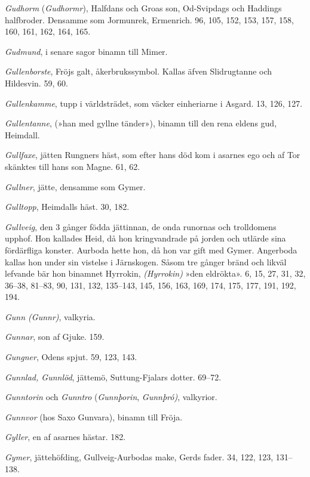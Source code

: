 \emph{Gudhorm} (\emph{Gudhormr}), Halfdans och Groas son, Od-Svipdags
och Haddings halfbroder. Densamme som Jormunrek, Ermenrich. 96, 105,
152, 153, 157, 158, 160, 161, 162, 164, 165.

\emph{Gudmund}, i senare sagor binamn till Mimer.

\emph{Gullenborste}, Fröjs galt, åkerbrukssymbol. Kallas äfven
Slidrugtanne och Hildesvin. 59, 60.

\emph{Gullenkamme}, tupp i världsträdet, som väcker einheriarne i
Asgard. 13, 126, 127.

\protect\hypertarget{lb1625905.xhtmlux5cux23start221}{}{}\protect\hypertarget{lb1625905.xhtmlux5cux23start221-a}{}{}\protect\hypertarget{lb1625905.xhtmlux5cux23start221-b}{}{}\protect\hypertarget{lb1625905.xhtmlux5cux23start221-c}{}{}\protect\hypertarget{lb1625905.xhtmlux5cux23start221-d}{}{}

\emph{Gullentanne}, (»han med gyllne tänder»), binamn till den rena
eldens gud, Heimdall.

\emph{Gullfaxe}, jätten Rungners häst, som efter hans död kom i asarnes
ego och af Tor skänktes till hans son Magne. 61, 62.

\emph{Gullner}, jätte, densamme som Gymer.

\emph{Gulltopp}, Heimdalls häst. 30, 182.

\emph{Gullveig}, den 3 gånger födda jättinnan, de onda runornas och
trolldomens upphof. Hon kallades Heid, då hon kringvandrade på jorden
och utlärde sina fördärfliga konster. Aurboda hette hon, då hon var gift
med Gymer. Angerboda kallas hon under sin vistelse i Järnskogen. Såsom
tre gånger bränd och likväl lefvande bär hon binamnet Hyrrokin,
\emph{(Hyrrokin)} »den eldrökta». 6, 15, 27, 31, 32, 36--38, 81--83, 90,
131, 132, 135--143, 145, 156, 163, 169, 174, 175, 177, 191, 192, 194.

\emph{Gunn (Gunnr)}, valkyria.

\emph{Gunnar}, son af Gjuke. 159.

\emph{Gungner}, Odens spjut. 59, 123, 143.

\emph{Gunnlad, Gunnlöd}, jättemö, Suttung-Fjalars dotter. 69--72.

\emph{Gunntorin} och \emph{Gunntro} (\emph{Gunnþorin}, \emph{Gunnþró)},
valkyrior.

\emph{Gunnvor} (hos Saxo Gunvara), binamn till Fröja.

\emph{Gyller}, en af asarnes hästar. 182.

\emph{Gymer}, jättehöfding, Gullveig-Aurbodas make, Gerds fader. 34,
122, 123, 131--138.

